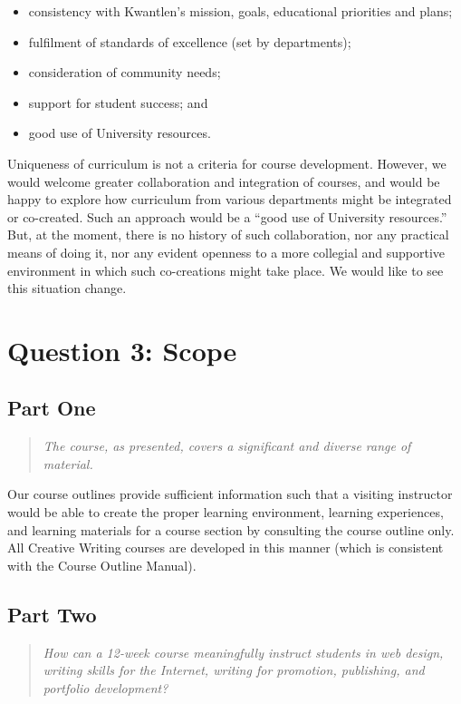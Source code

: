 \documentclass[letterpaper,10pt,headsepline]{scrreprt}
\begin{document}
\begin{itemize}
\item consistency with Kwantlen's mission, goals, educational priorities and plans;
\item fulfilment of standards of excellence (set by departments); 
\item consideration of community needs;
\item support for student success; and
\item good use of University resources.
\end{itemize}

Uniqueness of curriculum is not a criteria for course development. However, we would welcome greater collaboration and integration of courses, and would be happy to explore how curriculum from various departments might be integrated or co-created. Such an approach would be a ``good use of University resources.'' But, at the moment, there is no history of such collaboration, nor any practical means of doing it, nor any evident openness to a more collegial and supportive environment in which such co-creations might take place. We would like to see this situation change.

\section{Question 3: Scope}

\subsection{Part One}

\begin{quote}
\textit{The course, as presented, covers a significant and diverse range of material.}
\end{quote}

Our course outlines provide sufficient information such that a visiting instructor would be able to create the proper learning environment, learning experiences, and learning materials for a course section by consulting the course outline only. All Creative Writing courses are developed in this manner (which is consistent with the Course Outline Manual).

\subsection{Part Two}

\begin{quote}
\textit{How can a 12-week course meaningfully instruct students in web design, writing skills for the Internet, writing for promotion, publishing, and portfolio development?}
\end{quote}
\end{document}
